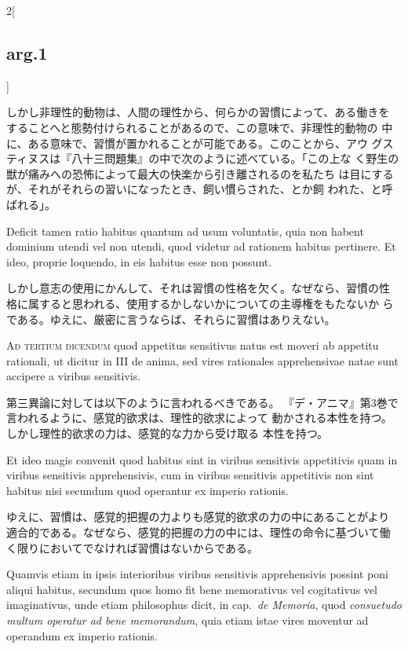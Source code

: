 \documentclass[paper=a4paper,fontsize=10pt,jafontsize=9pt,titlepage]{jlreq}
\begin{document}
\begin{paracol}{2}[\subsection{arg.1}]
\switchcolumn

しかし非理性的動物は、人間の理性から、何らかの習慣によって、ある働きを
 することへと態勢付けられることがあるので、この意味で、非理性的動物の
 中に、ある意味で、習慣が置かれることが可能である。このことから、アウ
 グスティヌスは『八十三問題集』の中で次のように述べている。「この上な
 く野生の獣が痛みへの恐怖によって最大の快楽から引き離されるのを私たち
 は目にするが、それがそれらの習いになったとき、飼い慣らされた、とか飼
 われた、と呼ばれる」。

\switchcolumn*

Deficit tamen ratio habitus quantum ad usum voluntatis, quia non
habent dominium utendi vel non utendi, quod videtur ad rationem
habitus pertinere. Et ideo, proprie loquendo, in eis habitus esse non
possunt.

\switchcolumn

しかし意志の使用にかんして、それは習慣の性格を欠く。なぜなら、習慣の性
 格に属すると思われる、使用するかしないかについての主導権をもたないか
 らである。ゆえに、厳密に言うならば、それらに習慣はありえない。

\switchcolumn*[\subsection{ad.3}]

{\scshape Ad tertium dicendum} quod appetitus sensitivus natus est moveri ab
 appetitu rationali, ut dicitur in III de anima, sed vires rationales
 apprehensivae natae sunt accipere a viribus sensitivis.

\switchcolumn

第三異論に対しては以下のように言われるべきである。
『デ・アニマ』第3巻で言われるように、感覚的欲求は、理性的欲求によって
 動かされる本性を持つ。しかし理性的欲求の力は、感覚的な力から受け取る
 本性を持つ。

\switchcolumn*

Et ideo magis
 convenit quod habitus sint in viribus sensitivis appetitivis quam in
 viribus sensitivis apprehensivis, cum in viribus sensitivis
 appetitivis non sint habitus nisi secundum quod operantur ex imperio
 rationis.

\switchcolumn

ゆえに、習慣は、感覚的把握の力よりも感覚的欲求の力の中にあることがより
適合的である。なぜなら、感覚的把握の力の中には、理性の命令に基づいて働
く限りにおいてでなければ習慣はないからである。

\switchcolumn*

Quamvis etiam in ipsis interioribus viribus sensitivis apprehensivis
possint poni aliqui habitus, secundum quos homo fit bene memorativus
vel cogitativus vel imaginativus, unde etiam philosophus dicit, in
cap.~{\itshape de Memoria}, quod {\itshape consuetudo multum operatur
ad bene memorandum}, quia etiam istae vires moventur ad operandum ex
imperio rationis.


\end{paracol}
\end{document}
